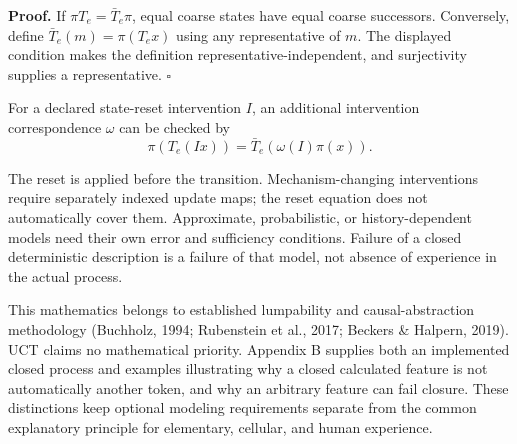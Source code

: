 \documentclass[
  11pt,
  a4paper,
]{article}
\begin{document}
\textbf{Proof.} If \(\pi T_e=\bar T_e\pi\), equal coarse states have
equal coarse successors. Conversely, define \(\bar T_e(m)=\pi(T_e x)\)
using any representative of \(m\). The displayed condition makes the
definition representative-independent, and surjectivity supplies a
representative. \(\square\)

For a declared state-reset intervention \(I\), an additional
intervention correspondence \(\omega\) can be checked by
\nopagebreak[4]
\[
\pi(T_e(Ix))=\bar T_e(\omega(I)\pi(x)).
\]

The reset is applied before the transition. Mechanism-changing
interventions require separately indexed update maps; the reset equation
does not automatically cover them. Approximate, probabilistic, or
history-dependent models need their own error and sufficiency
conditions. Failure of a closed deterministic description is a failure
of that model, not absence of experience in the actual process.

This mathematics belongs to established lumpability and
causal-abstraction methodology (Buchholz, 1994; Rubenstein et al., 2017;
Beckers \& Halpern, 2019). UCT claims no mathematical priority. Appendix
B supplies both an implemented closed process and examples illustrating
why a closed calculated feature is not automatically another token, and
why an arbitrary feature can fail closure. These distinctions keep
optional modeling requirements separate from the common explanatory
principle for elementary, cellular, and human experience.
\end{document}

